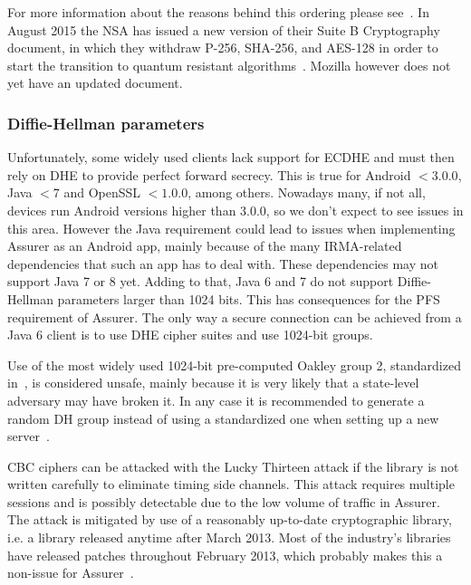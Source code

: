 For more information about the reasons behind this ordering please see~\cite{mozilla}. In August 2015 the NSA has issued a new version of their Suite B Cryptography document, in which they withdraw P-256, SHA-256, and AES-128 in order to start the transition to quantum resistant algorithms~\cite{nsacrypto}. Mozilla however does not yet have an updated document.

\subsubsection{Diffie-Hellman parameters}
Unfortunately, some widely used clients lack support for ECDHE and must then rely on DHE to provide perfect forward secrecy. This is true for Android $< 3.0.0$, Java $< 7$ and OpenSSL $< 1.0.0$, among others. Nowadays many, if not all, devices run Android versions higher than 3.0.0, so we don't expect to see issues in this area. However the Java requirement could lead to issues when implementing Assurer as an Android app, mainly because of the many IRMA-related dependencies that such an app has to deal with. These dependencies may not support Java 7 or 8 yet. Adding to that, Java 6 and 7 do not support Diffie-Hellman parameters larger than 1024 bits. This has consequences for the PFS requirement of Assurer. The only way a secure connection can be achieved from a Java 6 client is to use DHE cipher suites and use 1024-bit groups.

Use of the most widely used 1024-bit pre-computed Oakley group 2, standardized in~\cite{ike}, is considered unsafe, mainly because it is very likely that a state-level adversary may have broken it. In any case it is recommended to generate a random DH group instead of using a standardized one when setting up a new server~\cite{logjam}.

CBC ciphers can be attacked with the Lucky Thirteen attack if the library is not written carefully to eliminate timing side channels. This attack requires multiple sessions and is possibly detectable due to the low volume of traffic in Assurer. The attack is mitigated by use of a reasonably up-to-date cryptographic library, i.e. a library released anytime after March 2013. Most of the industry's libraries have released patches throughout February 2013, which probably makes this a non-issue for Assurer~\cite{lucky13}.

